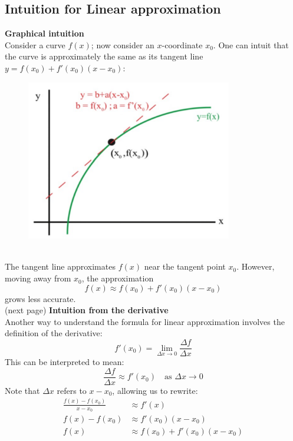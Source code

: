 \documentclass{report}
\begin{document}
\subsection{Intuition for Linear approximation} %
\textbf{Graphical intuition}\\
Consider a curve $f(x)$; now consider an $x$-coordinate $x_0$. One can intuit 
that the curve is approximately the same as its tangent line 
$y=f(x_0)+f'(x_0)(x-x_0)$:
\begin{figure}[h]
\includegraphics[width=9cm]{Capture19}\\
\centering
{}
\end{figure}\\
The tangent line approximates $f(x)$ near the tangent point $x_0$. However, moving
away from $x_0$, the approximation
\begin{equation*}
f(x)\approx f(x_0)+f'(x_0)(x-x_0)
\end{equation*}
grows less accurate.\\
(next page)
\newpage
\noindent\textbf{Intuition from the derivative}\\
Another way to understand the formula for linear approximation involves
the definition of the derivative:
\begin{equation*}
f'(x_0)=\lim_{\Delta x\to0}\frac{\Delta f}{\Delta x}
\end{equation*}
This can be interpreted to mean:
\begin{equation*}
\frac{\Delta f}{\Delta x}\approx f'(x_0)\quad\text{as $\Delta x\to0$}
\end{equation*}
Note that $\Delta x$ refers to $x-x_0$, allowing us to rewrite:
\begin{align*}
\frac{f(x)-f(x_0)}{x-x_0}&\approx f'(x)\\
f(x)-f(x_0)&\approx f'(x_0)(x-x_0)\\
f(x)&\approx f(x_0)+f'(x_0)(x-x_0)
\end{align*}
\newpage
\end{document}
